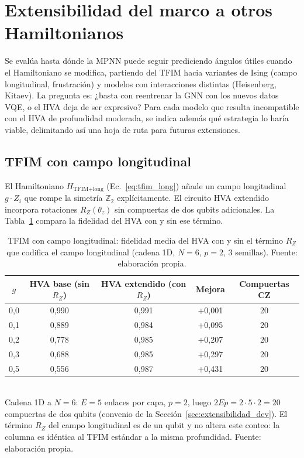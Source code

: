 \documentclass[11pt,a4paper,spanish]{book}
\begin{document}
\section{Extensibilidad del marco a otros Hamiltonianos}
\label{sec:extensibilidad}

Se evalúa hasta dónde la MPNN puede seguir prediciendo ángulos útiles cuando el Hamiltoniano se modifica, partiendo del TFIM hacia variantes de Ising (campo longitudinal, frustración) y modelos con interacciones distintas (Heisenberg, Kitaev). La pregunta es: ¿basta con reentrenar la GNN con los nuevos datos VQE, o el HVA deja de ser expresivo? Para cada modelo que resulta incompatible con el HVA de profundidad moderada, se indica además qué estrategia lo haría viable, delimitando así una hoja de ruta para futuras extensiones.

\subsection{TFIM con campo longitudinal}

El Hamiltoniano $H_{\text{TFIM+long}}$ (Ec.~\ref{eq:tfim_long}) añade un campo longitudinal $g \cdot Z_i$ que rompe la simetría $\mathbb{Z}_2$ explícitamente. El circuito HVA extendido incorpora rotaciones $R_Z(\theta_z)$ sin compuertas de dos qubits adicionales. La Tabla~\ref{tab:tfim_long} compara la fidelidad del HVA con y sin ese término.

\begin{table}[h]
\centering
\caption[TFIM con campo longitudinal: fidelidad del HVA con y sin $R_Z$]{TFIM con campo longitudinal: fidelidad media del HVA con y sin el término $R_Z$ que codifica el campo longitudinal (cadena 1D, $N = 6$, $p = 2$, 3 semillas). Fuente: elaboración propia.}
\label{tab:tfim_long}
\begin{tabular}{ccccc}
\toprule
\textbf{$g$} & \textbf{HVA base (sin $R_Z$)} & \textbf{HVA extendido (con $R_Z$)} & \textbf{Mejora} & \textbf{Compuertas CZ} \\
\midrule
0,0 & 0,990 & 0,991 & +0,001 & 20 \\
0,1 & 0,889 & 0,984 & +0,095 & 20 \\
0,2 & 0,778 & 0,985 & +0,207 & 20 \\
0,3 & 0,688 & 0,985 & +0,297 & 20 \\
0,5 & 0,556 & 0,987 & +0,431 & 20 \\
\bottomrule
\end{tabular}
\\[2pt]
\footnotesize Cadena 1D a $N = 6$: $E = 5$ enlaces por capa, $p = 2$, luego $2Ep = 2 \cdot 5 \cdot 2 = 20$ compuertas de dos qubits (convenio de la Sección~\ref{sec:extensibilidad_dev}). El término $R_Z$ del campo longitudinal es de un qubit y no altera este conteo: la columna es idéntica al TFIM estándar a la misma profundidad. Fuente: elaboración propia.
\end{table}
\end{document}
